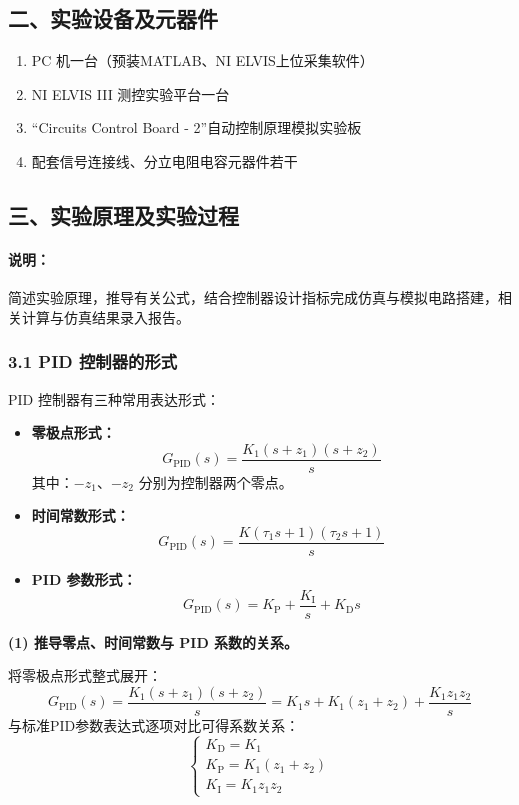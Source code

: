 \documentclass[12pt,a4paper,UTF8]{ctexart}
\begin{document}
\subsection{二、实验设备及元器件}
\begin{enumerate}
    \item PC 机一台（预装MATLAB、NI ELVIS上位采集软件）
    \item NI ELVIS III 测控实验平台一台
    \item ``Circuits Control Board - 2''自动控制原理模拟实验板
    \item 配套信号连接线、分立电阻电容元器件若干
\end{enumerate}

\subsection{三、实验原理及实验过程}
\paragraph{说明：}简述实验原理，推导有关公式，结合控制器设计指标完成仿真与模拟电路搭建，相关计算与仿真结果录入报告。

\subsubsection{3.1 PID 控制器的形式}
PID 控制器有三种常用表达形式：
\begin{itemize}
    \item \textbf{零极点形式：}
    \[
    G_{\text{PID}}(s) = \frac{K_1(s+z_1)(s+z_2)}{s}
    \]
    其中：$-z_1$、$-z_2$ 分别为控制器两个零点。

    \item \textbf{时间常数形式：}
    \[
    G_{\text{PID}}(s) = \frac{K(\tau_1 s+1)(\tau_2 s+1)}{s}
    \]

    \item \textbf{PID 参数形式：}
    \[
    G_{\text{PID}}(s) = K_{\text{P}} + \frac{K_{\text{I}}}{s} + K_{\text{D}} s
    \]
\end{itemize}

\textbf{(1) 推导零点、时间常数与 PID 系数的关系。}

将零极点形式整式展开：
\[
G_{\text{PID}}(s) = \frac{K_1(s+z_1)(s+z_2)}{s}
= K_1 s + K_1(z_1+z_2) + \frac{K_1 z_1 z_2}{s}
\]
与标准PID参数表达式逐项对比可得系数关系：
\[
\begin{cases}
K_{\text{D}} = K_1 \\
K_{\text{P}} = K_1(z_1+z_2) \\
K_{\text{I}} = K_1 z_1 z_2
\end{cases}
\]
\end{document}
